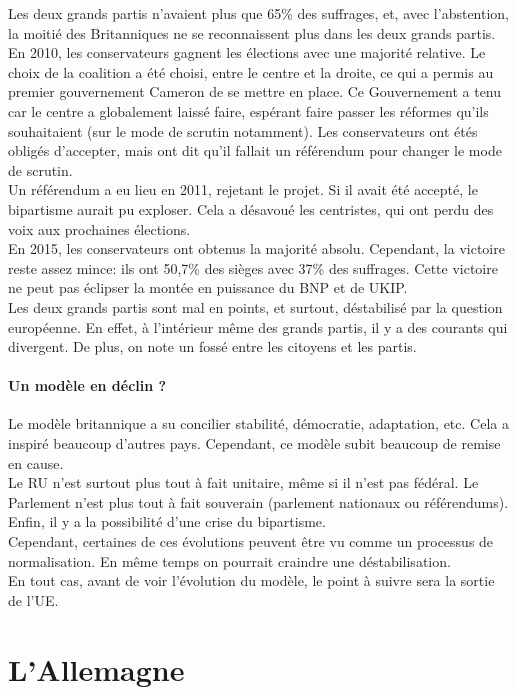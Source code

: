 \documentclass[10pt, a4paper, openany]{book}
\begin{document}
Les deux grands partis n'avaient plus que 65\% des suffrages, et, avec l'abstention, la moitié des Britanniques ne se reconnaissent plus dans les deux grands partis. En 2010, les conservateurs gagnent les élections avec une majorité relative. Le choix de la coalition a été choisi, entre le centre et la droite, ce qui a permis au premier gouvernement Cameron de se mettre en place. Ce Gouvernement a tenu car le centre a globalement laissé faire, espérant faire passer les réformes qu'ils souhaitaient (sur le mode de scrutin notamment). Les conservateurs ont étés obligés d'accepter, mais ont dit qu'il fallait un référendum pour changer le mode de scrutin. \\
Un référendum a eu lieu en 2011, rejetant le projet. Si il avait été accepté, le bipartisme aurait pu exploser. Cela a désavoué les centristes, qui ont perdu des voix aux prochaines élections. \\
En 2015, les conservateurs ont obtenus la majorité absolu. Cependant, la victoire reste assez mince: ils ont 50,7\% des sièges avec 37\% des suffrages. Cette victoire ne peut pas éclipser la montée en puissance du BNP et de UKIP. \\
Les deux grands partis sont mal en points, et surtout, déstabilisé par la question européenne. En effet, à l'intérieur même des grands partis, il y a des courants qui divergent. De plus, on note un fossé entre les citoyens et les partis. 


\subsubsection{Un modèle en déclin ?}

Le modèle britannique a su concilier stabilité, démocratie, adaptation, etc. Cela a inspiré beaucoup d'autres pays. Cependant, ce modèle subit beaucoup de remise en cause. \\
Le RU n'est surtout plus tout à fait unitaire, même si il n'est pas fédéral. Le Parlement n'est plus tout à fait souverain (parlement nationaux ou référendums). Enfin, il y a la possibilité d'une crise du bipartisme. \\
Cependant, certaines de ces évolutions peuvent être vu comme un processus de normalisation. En même temps on pourrait craindre une déstabilisation. \\
En tout cas, avant de voir l'évolution du modèle, le point à suivre sera la sortie de l'UE. 

\chapter{L'Allemagne}
\end{document}
